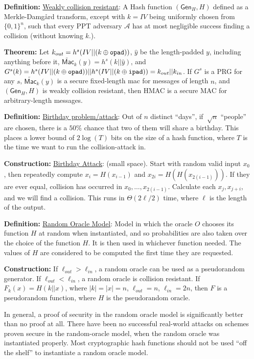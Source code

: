 \documentclass[10pt]{article}
\newcommand{\AAA}{\mathcal{A}}
\newcommand{\defn}[1]{{\bf Definition:} \underline{#1}}
\newcommand{\thm}[1]{{\bf Theorem:} \underline{#1}}
\newcommand{\con}[1]{{\bf Construction:} \underline{#1}}
\newcommand{\Mac}{\mathsf{Mac}}
\newcommand{\Gen}{\mathsf{Gen}}
\newcommand{\xor}{\oplus}
\newcommand{\opad}{{\tt opad}}
\newcommand{\ipad}{{\tt ipad}}
\begin{document}
\begin{multicols}{4}
\defn{Weakly collision resistant}: A Hash function $(\Gen_H, H)$ defined as a Merkle-Damg\r{a}rd transform, except with $k=IV$ being uniformly chosen from $\{0,1\}^n$, such that every PPT adversary $\AAA$ has at most negligible success finding a collision (without knowing $k$.).

\thm{}Let $k_{out}=h^s(IV||(k\xor\opad))$, $\hat{y}$ be the length-padded $y$, including anything before it, $\widetilde{\Mac}_k(y)=h^s(k||\hat{y})$, and $G^s(k)=h^s(IV||(k\xor\opad))||h^s(IV||(k\xor\ipad))=k_{out}||k_{in}$. If $G^s$ is a PRG for any $s$, $\widetilde{\Mac}_k(y)$ is a secure fixed-length mac for messages of length $n$, and $(\Gen_H,H)$ is weakly collision resistant, then HMAC is a secure MAC for arbitrary-length messages.

\defn{Birthday problem/attack}: Out of $n$ distinct ``days'', if $~\sqrt{n}$ ``people'' are chosen, there is a $50\%$ chance that two of them will share a birthday. This places a lower bound of $2\log(T)$ bits on the size of a hash function, where $T$ is the time we want to run the collision-attack in.

\con{Birthday Attack}: (small space). Start with random valid input $x_0$, then repeatedly compute $x_i=H(x_{i-1})$ and $x_{2i}=H(H(x_{2(i-1)}))$. If they are ever equal, collision has occurred in $x_0,\dots,x_{2(i-1)}$. Calculate each $x_j,x_{j+i}$, and we will find a collision. This runs in $\Theta(2{\ell/2})$ time, where $\ell$ is the length of the output.

\defn{Random Oracle Model}: Model in which the oracle $O$ chooses its function $H$ at random when instantiated, and so probabilities are also taken over the choice of the function $H$. It is then used in whichever function needed. The values of $H$ are considered to be computed the first time they are requested.

\con{} If $\ell_{out}>\ell_{in}$, a random oracle can be used as a pseudorandom generator. If $\ell_{out}<\ell_{in}$, a random oracle is collision resistant. If $F_k(x)=H(k||x)$, where $|k|=|x|=n$, $\ell_{out}=n$, $\ell_{in}=2n$, then $F$ is a pseudorandom function, where $H$ is the pseudorandom oracle.

In general, a proof of security in the random oracle model is significantly better than no proof at all. There have been no successful real-world attacks on schemes proven secure in the random-oracle model, when the random oracle was instantiated properly. Most cryptographic hash functions should not be used ``off the shelf'' to instantiate a random oracle model.


\end{multicols}
\end{document}
